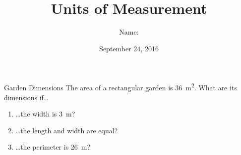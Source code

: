 \documentclass[14pt,letterpaper]{article}
\title{Units of Measurement}
\author{Name: \underline{\hspace{5cm}}}
\date{September 24, 2016}
\begin{document}
\HomeworkTitle

\thispagestyle{empty}

\begin{problem}{Garden Dimensions}
 The area of a rectangular garden is \SI{36}{\metre\squared}. What are its
 dimensions if\ldots

 \begin{enumerate}[\hspace{1cm}a.]
   \item \ldots{}the width is \SI{3}{\metre}?
   \item \ldots{}the length and width are equal?
   \item \ldots{}the perimeter is \SI{26}{\metre}?
 \end{enumerate}
\end{problem}
\end{document}
